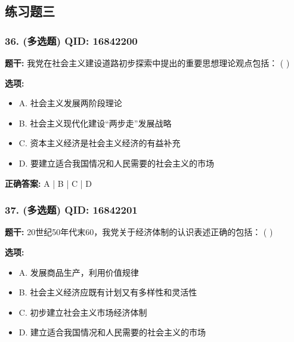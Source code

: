 \documentclass[12pt,UTF8]{ctexart}
\begin{document}
\subsection*{练习题三}

\subsubsection*{36. (多选题) \small QID: 16842200}

\textbf{题干:}
我党在社会主义建设道路初步探索中提出的重要思想理论观点包括： ( )

\textbf{选项:}
\begin{itemize}[leftmargin=*]

  \item A. 社会主义发展两阶段理论

  \item B. 社会主义现代化建设“两步走”发展战略

  \item C. 资本主义经济是社会主义经济的有益补充

  \item D. 要建立适合我国情况和人民需要的社会主义的市场

\end{itemize}

\textbf{正确答案:}
A | B | C | D

\vspace{0.3em}\hrulefill\vspace{0.7em}

\subsubsection*{37. (多选题) \small QID: 16842201}

\textbf{题干:}
20世纪50年代末60，我党关于经济体制的认识表述正确的包括： ( )

\textbf{选项:}
\begin{itemize}[leftmargin=*]

  \item A. 发展商品生产，利用价值规律

  \item B. 社会主义经济应既有计划又有多样性和灵活性

  \item C. 初步建立社会主义市场经济体制

  \item D. 建立适合我国情况和人民需要的社会主义的市场

\end{itemize}
\end{document}

